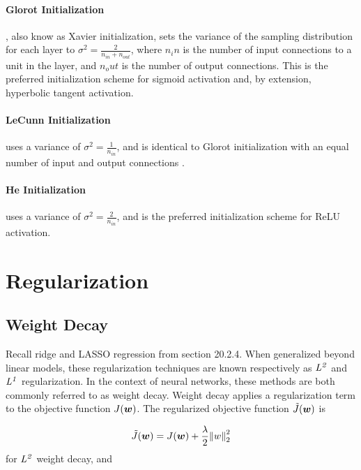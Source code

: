 \documentclass{article}
\begin{document}
\paragraph*{Glorot Initialization}, also know as Xavier initialization, sets the variance of the sampling distribution for each layer to \(\sigma^2 = \frac{2}{n_{in} + n_{out}}\), where \(n_in\) is the number of input connections to a unit in the layer, and \(n_out\) is the number of output connections. This is the preferred initialization scheme for sigmoid activation \cite{pml1book} and, by extension, hyperbolic tangent activation.

\paragraph*{LeCunn Initialization} uses a variance of \(\sigma^2 = \frac{1}{n_{in}}\), and is identical to Glorot initialization with an equal number of input and output connections \cite{pml1book}.

\paragraph*{He Initialization} uses a variance of \(\sigma^2 = \frac{2}{n_{in}}\), and is the preferred initialization scheme for ReLU activation. 

\section{Regularization} %

\subsection{Weight Decay} %

Recall ridge and LASSO regression from section 20.2.4. When generalized beyond linear models, these regularization techniques are known respectively as \(\it{L}^2\) and \(\it{L}^1\) regularization. In the context of neural networks, these methods are both commonly referred to as weight decay. Weight decay applies a regularization term to the objective function \(J(\vb*{w})\). The regularized objective function \(\tilde{J}(\vb*{w})\) is 

\begin{equation}
    \tilde{J}(\vb*{w}) = J(\vb*{w}) +\frac{\lambda}{2}\norm{w}^2_2
    \label{L2-reg}
\end{equation} for \(\it{L}^2\) weight decay, and 
\end{document}
